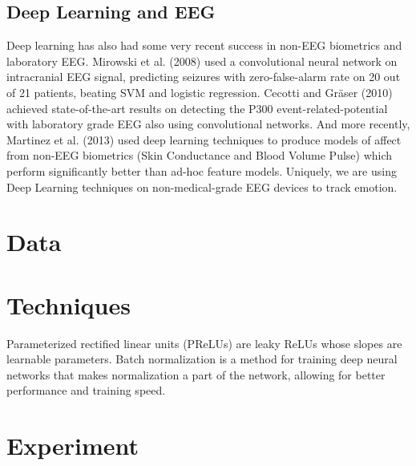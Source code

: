 \documentclass{article} %
\begin{document}
\subsection{Deep Learning and EEG}
Deep learning has also had some very recent success in non-EEG biometrics and laboratory EEG. Mirowski et al. (2008) used a convolutional neural network on intracranial EEG signal, predicting seizures with zero-false-alarm rate on 20 out of 21 patients, beating SVM and logistic regression. Cecotti and Gräser (2010) achieved state-of-the-art results on detecting the P300 event-related-potential with laboratory grade EEG also using convolutional networks. And more recently, Martinez et al.
(2013) used deep learning techniques to produce models of affect from non-EEG biometrics (Skin Conductance and Blood Volume Pulse) which perform significantly better than ad-hoc feature models.
Uniquely, we are using Deep Learning techniques on non-medical-grade EEG devices to track emotion.

\section{Data} \label{section:data}

\section{Techniques} \label{section:techniques}
Parameterized rectified linear units (PReLUs) \cite{DBLP:journals/corr/HeZR015} are leaky ReLUs whose slopes are learnable parameters.
Batch normalization \cite{DBLP:journals/corr/IoffeS15} is a method for training deep neural networks that makes normalization a part of the network, allowing for better performance and training speed.

\section{Experiment} \label{section:experiment}
\end{document}
